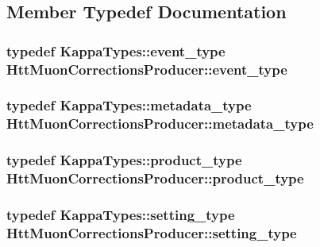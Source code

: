 \subsection{Member Typedef Documentation}
\hypertarget{classHttMuonCorrectionsProducer_af824f6024adedbe70fe035266dadf478}{
\subsubsection[{event\_\-type}]{\setlength{\rightskip}{0pt plus 5cm}typedef KappaTypes::event\_\-type {\bf HttMuonCorrectionsProducer::event\_\-type}}}
\label{classHttMuonCorrectionsProducer_af824f6024adedbe70fe035266dadf478}
\hypertarget{classHttMuonCorrectionsProducer_a476ef6cd31fb12781cc58bba7e4101b8}{
\subsubsection[{metadata\_\-type}]{\setlength{\rightskip}{0pt plus 5cm}typedef KappaTypes::metadata\_\-type {\bf HttMuonCorrectionsProducer::metadata\_\-type}}}
\label{classHttMuonCorrectionsProducer_a476ef6cd31fb12781cc58bba7e4101b8}
\hypertarget{classHttMuonCorrectionsProducer_a3c072777f0a0774ed74f65a8b2ad9266}{
\subsubsection[{product\_\-type}]{\setlength{\rightskip}{0pt plus 5cm}typedef KappaTypes::product\_\-type {\bf HttMuonCorrectionsProducer::product\_\-type}}}
\label{classHttMuonCorrectionsProducer_a3c072777f0a0774ed74f65a8b2ad9266}
\hypertarget{classHttMuonCorrectionsProducer_a4533d535084a1cddd6040a94f5121029}{
\subsubsection[{setting\_\-type}]{\setlength{\rightskip}{0pt plus 5cm}typedef KappaTypes::setting\_\-type {\bf HttMuonCorrectionsProducer::setting\_\-type}}}
